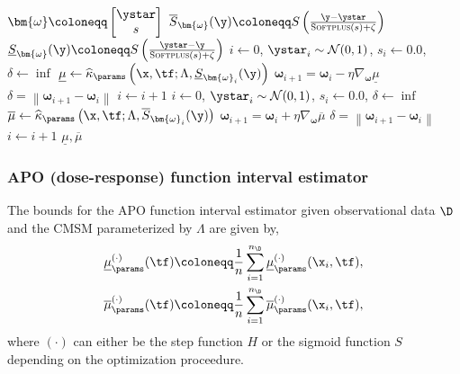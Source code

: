 \begin{algorithm}
    \caption{Gradient Descent Interval Optimizer}
    \label{alg:gradient-descent}
    \begin{algorithmic}[1]
            \State $\bm{\omega} \coloneqq \begin{bmatrix} \ystar \\ s \end{bmatrix}$
            \State $\overline{S}_{\bm{\omega}}(\y) \coloneqq S\left(\frac{\y-\ystar}{\textsc{Softplus}(s) + \zeta}\right)$
            \State $\underline{S}_{\bm{\omega}}(\y) \coloneqq S\left(\frac{\ystar-\y}{\textsc{Softplus}(s) + \zeta}\right)$
            \State $i \gets 0$, $\ystar_i \sim \mathcal{N}(0, 1)$, $s_i \gets 0.0$, $\delta \gets \inf$
            \While{$\delta > \epsilon$}
                \State $\underline{\mu} \gets \widehat{\kappa}_{\params}\left(\x, \tf; \Lambda, \underline{S}_{\bm{\omega}_i}(\y)\right)$
                \State $\bm{\omega}_{i+1} = \bm{\omega}_{i} - \eta \nabla_{\bm{\omega}} \underline{\mu}$ 
                \State $\delta = \left\lVert{\bm{\omega}_{i+1} - \bm{\omega}_{i}}\right\rVert$
                \State $i \gets i + 1$
            \EndWhile
            \State $i \gets 0$, $\ystar_i \sim \mathcal{N}(0, 1)$, $s_i \gets 0.0$, $\delta \gets \inf$
            \While{$\delta > \epsilon$}
                \State $\overline{\mu} \gets \widehat{\kappa}_{\params}\left(\x, \tf; \Lambda, \overline{S}_{\bm{\omega}_i}(\y)\right)$
                \State $\bm{\omega}_{i+1} = \bm{\omega}_{i} + \eta \nabla_{\bm{\omega}} \overline{\mu}$ 
                \State $\delta = \left\lVert{\bm{\omega}_{i+1} - \bm{\omega}_{i}}\right\rVert$
                \State $i \gets i + 1$
            \EndWhile
            \State \Return $\underline{\mu}, \overline{\mu}$
        \EndFunction
    \end{algorithmic}
\end{algorithm}

\subsubsection{APO (dose-response) function interval estimator}
The bounds for the APO function interval estimator given observational data $\D$ and the CMSM parameterized by $\Lambda$ are given by,
\begin{equation*}
    \begin{split}
        \underline{\mu}_{\params}^{(\cdot)}(\tf) &\coloneqq \frac{1}{n}\sum_{i=1}^{n_{\D}} \underline{\mu}_{\params}^{(\cdot)}(\x_i, \tf), \\
        \overline{\mu}_{\params}^{(\cdot)}(\tf) &\coloneqq \frac{1}{n}\sum_{i=1}^{n_{\D}} \overline{\mu}_{\params}^{(\cdot)}(\x_i, \tf),
    \end{split}
\end{equation*}
where $(\cdot)$ can either be the step function $H$ or the sigmoid function $S$ depending on the optimization proceedure.
